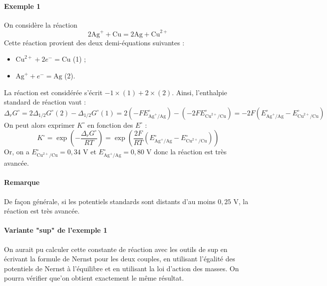 \documentclass[french]{book}
\theoremstyle{plain}
\theoremstyle{definition}
\theoremstyle{remark}
\begin{document}
\paragraph{Exemple 1}On considère la réaction $$2\text{Ag}^{+}+\text{Cu}=2\text{Ag}+\text{Cu}^{2+}$$ Cette réaction provient des deux demi-équations suivantes :\begin{itemize}
	\item $\text{Cu}^{2+}+2e^-=\text{Cu}$ (1) ;
	\item $\text{Ag}^++e^-=\text{Ag}$ (2).
\end{itemize} La réaction est considérée s'écrit $-1\times(1)+2\times(2)$. Ainsi, l'enthalpie standard de réaction vaut : $$\Delta_rG^\circ=2\Delta_{1/2}G^\circ(2)-\Delta_{1/2}G^\circ(1)=2(-FE_{\text{Ag}^+/\text{Ag}}^\circ)-(-2FE_{\text{Cu}^{2+}/\text{Cu}}^\circ)=-2F(E_{\text{Ag}^+/\text{Ag}}^\circ-E_{\text{Cu}^{2+}/\text{Cu}}^\circ)$$ On peut alors exprimer $K^\circ$ en fonction des $E^\circ$ : $$K^\circ=\exp\left(-\frac{\Delta_rG^\circ}{RT}\right)=\exp\left(\frac{2F}{RT}(E_{\text{Ag}^+/\text{Ag}}^\circ-E_{\text{Cu}^{2+}/\text{Cu}}^\circ)\right)$$ Or, on a $E_{\text{Cu}^{2+}/\text{Cu}}^\circ=0,34$ V et $E_{\text{Ag}^+/\text{Ag}}^\circ=0,80$ V donc la réaction est très avancée.

\paragraph{Remarque} De façon générale, si les potentiels standards sont distants d'au moins $0,25$ V, la réaction est très avancée.

\paragraph{Variante "sup" de l'exemple 1} On aurait pu calculer cette constante de réaction avec les outils de sup en écrivant la formule de Nernst pour les deux couples, en utilisant l'égalité des potentiels de Nernst à l'équilibre et en utilisant la loi d'action des masses. On pourra vérifier que'on obtient exactement le même résultat.
\end{document}
